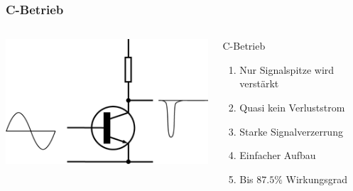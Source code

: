 \begin{frame}
    \frametitle{C-Betrieb}
        \begin{columns}[c]
        \begin{center}
            \includegraphics[width=1\textwidth,height=.8\textheight,keepaspectratio]{a07/Electronic_Amplifier_Class_C.png}\\
	    {\tiny \hyperlink{refs}{\cite{wm}}}
    \end{center}
     \large
    \begin{block}{C-Betrieb}
	    \begin{enumerate} 
			\item Nur Signalspitze wird verstärkt
			\item Quasi kein Verluststrom
			\item Starke Signalverzerrung
			\item Einfacher Aufbau
			\item Bis $87.5\%$ Wirkungsgrad
    	\end{enumerate}
    \end{block}
    \end{columns}
\end{frame}

